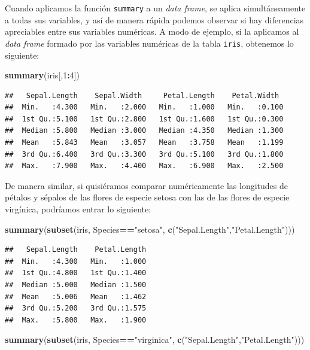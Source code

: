 \documentclass[]{book}
\newenvironment{Shaded}{\begin{snugshade}}{\end{snugshade}}
\newcommand{\DecValTok}[1]{\textcolor[rgb]{0.00,0.00,0.81}{#1}}
\newcommand{\KeywordTok}[1]{\textcolor[rgb]{0.13,0.29,0.53}{\textbf{#1}}}
\newcommand{\NormalTok}[1]{#1}
\newcommand{\OperatorTok}[1]{\textcolor[rgb]{0.81,0.36,0.00}{\textbf{#1}}}
\newcommand{\StringTok}[1]{\textcolor[rgb]{0.31,0.60,0.02}{#1}}
\theoremstyle{definition}
\theoremstyle{definition}
\theoremstyle{definition}
\theoremstyle{remark}
\begin{document}
Cuando aplicamos la función \texttt{summary} a un \emph{data frame}, se aplica simultáneamente a todas sus variables, y así de manera rápida podemos observar si hay diferencias apreciables entre sus variables numéricas. A modo de ejemplo, si la aplicamos al \emph{data frame} formado por las variables numéricas de la tabla \texttt{iris}, obtenemos lo siguiente:

\begin{Shaded}
\begin{Highlighting}[]
\KeywordTok{summary}\NormalTok{(iris[,}\DecValTok{1}\OperatorTok{:}\DecValTok{4}\NormalTok{])}
\end{Highlighting}
\end{Shaded}

\begin{verbatim}
##   Sepal.Length    Sepal.Width     Petal.Length    Petal.Width   
##  Min.   :4.300   Min.   :2.000   Min.   :1.000   Min.   :0.100  
##  1st Qu.:5.100   1st Qu.:2.800   1st Qu.:1.600   1st Qu.:0.300  
##  Median :5.800   Median :3.000   Median :4.350   Median :1.300  
##  Mean   :5.843   Mean   :3.057   Mean   :3.758   Mean   :1.199  
##  3rd Qu.:6.400   3rd Qu.:3.300   3rd Qu.:5.100   3rd Qu.:1.800  
##  Max.   :7.900   Max.   :4.400   Max.   :6.900   Max.   :2.500
\end{verbatim}

De manera similar, si quisiéramos comparar numéricamente las longitudes de pétalos y sépalos de las flores de especie setosa con las de las flores de especie virgínica, podríamos entrar lo siguiente:

\begin{Shaded}
\begin{Highlighting}[]
\KeywordTok{summary}\NormalTok{(}\KeywordTok{subset}\NormalTok{(iris, Species}\OperatorTok{==}\StringTok{"setosa"}\NormalTok{, }\KeywordTok{c}\NormalTok{(}\StringTok{"Sepal.Length"}\NormalTok{,}\StringTok{"Petal.Length"}\NormalTok{)))}
\end{Highlighting}
\end{Shaded}

\begin{verbatim}
##   Sepal.Length    Petal.Length  
##  Min.   :4.300   Min.   :1.000  
##  1st Qu.:4.800   1st Qu.:1.400  
##  Median :5.000   Median :1.500  
##  Mean   :5.006   Mean   :1.462  
##  3rd Qu.:5.200   3rd Qu.:1.575  
##  Max.   :5.800   Max.   :1.900
\end{verbatim}

\begin{Shaded}
\begin{Highlighting}[]
\KeywordTok{summary}\NormalTok{(}\KeywordTok{subset}\NormalTok{(iris, Species}\OperatorTok{==}\StringTok{"virginica"}\NormalTok{, }\KeywordTok{c}\NormalTok{(}\StringTok{"Sepal.Length"}\NormalTok{,}\StringTok{"Petal.Length"}\NormalTok{)))}
\end{Highlighting}
\end{Shaded}
\end{document}
